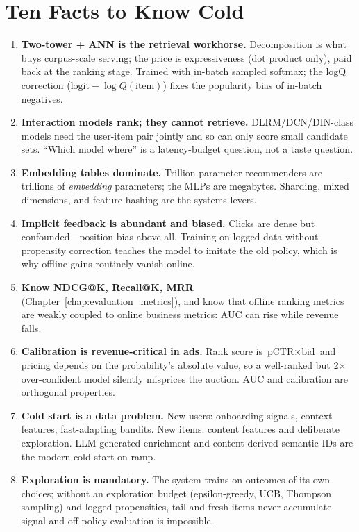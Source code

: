 \section{Ten Facts to Know Cold}
\label{sec:recsys_bridge_facts}

\begin{enumerate}
    \item \textbf{Two-tower + ANN is the retrieval workhorse.} Decomposition is what buys corpus-scale serving; the price is expressiveness (dot product only), paid back at the ranking stage. Trained with in-batch sampled softmax; the logQ correction ($\text{logit} - \log Q(\text{item})$) fixes the popularity bias of in-batch negatives.
    \item \textbf{Interaction models rank; they cannot retrieve.} DLRM/DCN/DIN-class models need the user-item pair jointly and so can only score small candidate sets. ``Which model where'' is a latency-budget question, not a taste question.
    \item \textbf{Embedding tables dominate.} Trillion-parameter recommenders are trillions of \textit{embedding} parameters; the MLPs are megabytes. Sharding, mixed dimensions, and feature hashing are the systems levers.
    \item \textbf{Implicit feedback is abundant and biased.} Clicks are dense but confounded---position bias above all. Training on logged data without propensity correction teaches the model to imitate the old policy, which is why offline gains routinely vanish online.
    \item \textbf{Know NDCG@K, Recall@K, MRR} (Chapter~\ref{chap:evaluation_metrics}), and know that offline ranking metrics are weakly coupled to online business metrics: AUC can rise while revenue falls.
    \item \textbf{Calibration is revenue-critical in ads.} Rank score is $\text{pCTR} \times \text{bid}$ and pricing depends on the probability's absolute value, so a well-ranked but 2$\times$ over-confident model silently misprices the auction. AUC and calibration are orthogonal properties.
    \item \textbf{Cold start is a data problem.} New users: onboarding signals, context features, fast-adapting bandits. New items: content features and deliberate exploration. LLM-generated enrichment and content-derived semantic IDs are the modern cold-start on-ramp.
    \item \textbf{Exploration is mandatory.} The system trains on outcomes of its own choices; without an exploration budget (epsilon-greedy, UCB, Thompson sampling) and logged propensities, tail and fresh items never accumulate signal and off-policy evaluation is impossible.

\end{enumerate}
